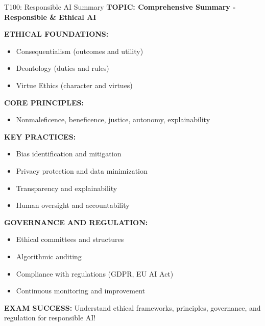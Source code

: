 \documentclass[8pt]{beamer}
\begin{document}
	\begin{frame}{T100: Responsible AI Summary}
		\fontsize{6.5}{7.5}\selectfont
		\textbf{TOPIC: Comprehensive Summary - Responsible \& Ethical AI}
		
		\vspace{0.1cm}
		\textbf{ETHICAL FOUNDATIONS:}
		\begin{itemize}
			\item Consequentialism (outcomes and utility)
			\item Deontology (duties and rules)
			\item Virtue Ethics (character and virtues)
		\end{itemize}
		
		\vspace{0.1cm}
		\textbf{CORE PRINCIPLES:}
		\begin{itemize}
			\item Nonmaleficence, beneficence, justice, autonomy, explainability
		\end{itemize}
		
		\vspace{0.1cm}
		\textbf{KEY PRACTICES:}
		\begin{itemize}
			\item Bias identification and mitigation
			\item Privacy protection and data minimization
			\item Transparency and explainability
			\item Human oversight and accountability
		\end{itemize}
		
		\vspace{0.1cm}
		\textbf{GOVERNANCE AND REGULATION:}
		\begin{itemize}
			\item Ethical committees and structures
			\item Algorithmic auditing
			\item Compliance with regulations (GDPR, EU AI Act)
			\item Continuous monitoring and improvement
		\end{itemize}
		
		\textcolor{myred}{\textbf{EXAM SUCCESS:}} Understand \textcolor{myblue}{ethical frameworks, principles, governance, and regulation} for responsible AI!
	\end{frame}
	
\end{document}
